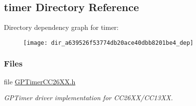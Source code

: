 \subsection{timer Directory Reference}
\label{dir_a639526f53774db20ace40dbb8201be4}
Directory dependency graph for timer\+:
\nopagebreak
\begin{figure}[H]
\begin{center}
\leavevmode
\texttt{[image: dir\_a639526f53774db20ace40dbb8201be4\_dep]}
\end{center}
\end{figure}
\subsubsection*{Files}
\begin{DoxyCompactItemize}
\item 
file \hyperlink{_g_p_timer_c_c26_x_x_8h}{G\+P\+Timer\+C\+C26\+X\+X.\+h}
\begin{DoxyCompactList}\small\item\em G\+P\+Timer driver implementation for C\+C26\+X\+X/\+C\+C13\+X\+X. \end{DoxyCompactList}\end{DoxyCompactItemize}
